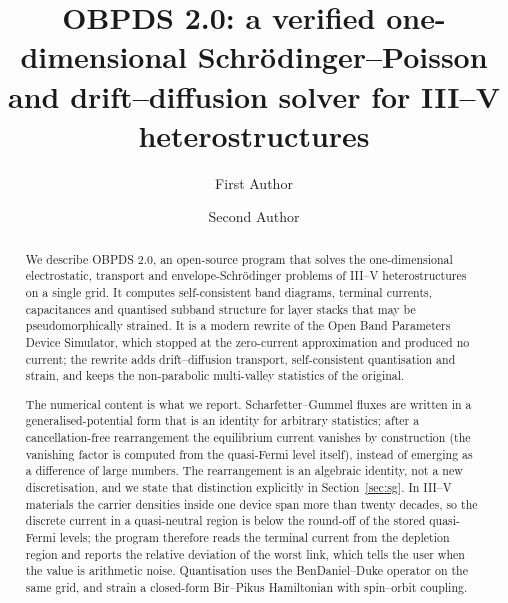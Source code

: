 \documentclass[preprint,12pt]{elsarticle}
\begin{document}
\setlength{\emergencystretch}{2em}

\begin{frontmatter}

\title{OBPDS 2.0: a verified one-dimensional Schr\"odinger--Poisson and
drift--diffusion solver for III--V heterostructures}

\author[a]{First Author}
\author[a]{Second Author}
\address[a]{Affiliation, City, Country}

\begin{abstract}
We describe OBPDS 2.0, an open-source program that solves the one-dimensional
electrostatic, transport and envelope-Schr\"odinger problems of III--V
heterostructures on a single grid. It computes self-consistent band diagrams,
terminal currents, capacitances and quantised subband structure for layer
stacks that may be pseudomorphically strained. It is a modern rewrite of the
Open Band Parameters Device Simulator, which stopped at the zero-current
approximation and produced no current; the rewrite adds
drift--diffusion transport, self-consistent quantisation and strain, and keeps
the non-parabolic multi-valley statistics of the original.

The numerical content is what we report. Scharfetter--Gummel
fluxes are written in a generalised-potential form that is an identity for
arbitrary statistics; after a cancellation-free rearrangement the
equilibrium current vanishes by construction (the vanishing factor is
computed from the quasi-Fermi level itself), instead of emerging as a
difference of large numbers. The rearrangement is an algebraic identity, not
a new discretisation, and we state that distinction explicitly in
Section~\ref{sec:sg}.
In III--V materials the carrier densities inside one device span more than
twenty decades, so the discrete current in a quasi-neutral region is below the
round-off of the stored quasi-Fermi levels; the program therefore reads the
terminal current from the depletion region and reports the relative deviation
of the worst link, which tells the user when the value is arithmetic noise.
Quantisation uses the BenDaniel--Duke operator on the same grid, and strain a
closed-form Bir--Pikus Hamiltonian with spin--orbit coupling.


\end{abstract}
\end{frontmatter}
\end{document}
